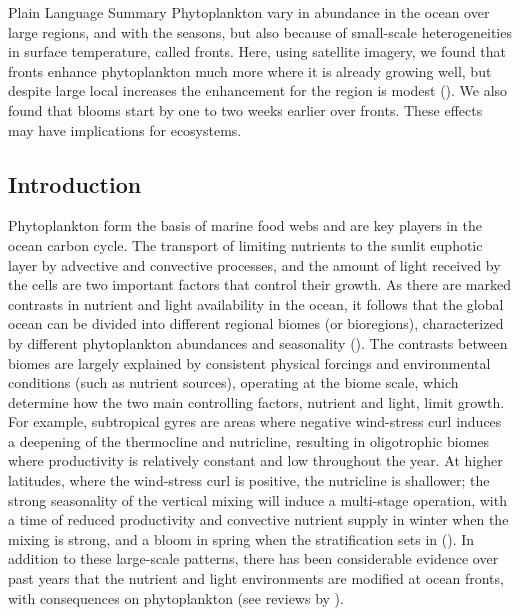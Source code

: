 \begin{articleBlock}{Plain Language Summary}
  Phytoplankton vary in abundance in the ocean over large regions, and with the seasons, but also because of small-scale heterogeneities in surface temperature, called fronts.
  Here, using satellite imagery, we found that fronts enhance phytoplankton much more where it is already growing well, but despite large local increases the enhancement for the region is modest ().
  We also found that blooms start by one to two weeks earlier over fronts. These effects may have implications for ecosystems.
\end{articleBlock}


\subsection{Introduction}

Phytoplankton form the basis of marine food webs and are key players in the ocean carbon cycle.
The transport of limiting nutrients to the sunlit euphotic layer by advective and convective processes, and the amount of light received by the cells  are two important factors that control their growth.
As there are marked contrasts in nutrient and light availability in the ocean, it follows that the global ocean can be divided into different regional biomes (or bioregions), characterized by different phytoplankton abundances and seasonality (\cite{longhurst_2007, vichi_2011a, bock_2022}).
The contrasts between biomes are largely explained by consistent physical forcings and environmental conditions (such as nutrient sources), operating at the biome scale, which determine how the two main controlling factors, nutrient and light, limit growth.
For example, subtropical gyres are areas where negative wind-stress curl induces a deepening of the thermocline and nutricline, resulting in oligotrophic biomes where productivity is relatively constant and low throughout the year.
At higher latitudes, where the wind-stress curl is positive, the nutricline is shallower; the strong seasonality of the vertical mixing will induce a multi-stage operation, with a time of reduced productivity and convective nutrient supply in winter when the mixing is strong, and a bloom in spring when the stratification sets in (\cite{wilson_2005, williams_2011}).
In addition to these large-scale patterns, there has been considerable evidence over past years that the nutrient and light environments are modified at ocean fronts, with consequences on phytoplankton (see reviews by \cite{levy_2012, mahadevan_2016, levy_2018}).

